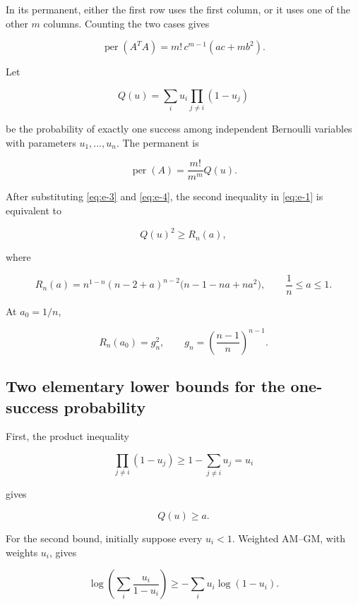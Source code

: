\documentclass[11pt,a4paper]{article}
\theoremstyle{definition}
\theoremstyle{remark}
\begin{document}
In its permanent, either the first row uses the first column, or it uses
one of the other \(m\) columns. Counting the two cases gives

\begin{equation}\label{eq:e-3}
\operatorname{per}(A^TA)
=m!\,c^{m-1}(ac+mb^2).
\end{equation}

Let

\[
Q(u)=\sum_i u_i\prod_{j\ne i}(1-u_j)
\]

be the probability of exactly one success among independent Bernoulli
variables with parameters \(u_1,\ldots,u_n\). The permanent is

\begin{equation}\label{eq:e-4}
\operatorname{per}(A)=\frac{m!}{m^m}Q(u).
\end{equation}

After substituting \eqref{eq:e-3} and \eqref{eq:e-4}, the second inequality in \eqref{eq:e-1} is
equivalent to

\begin{equation}\label{eq:e-5}
Q(u)^2\ge R_n(a),
\end{equation}

where

\begin{equation}\label{eq:e-6}
R_n(a)=
n^{1-n}(n-2+a)^{n-2}\bigl(n-1-na+na^2\bigr),
\qquad \frac1n\le a\le1.
\end{equation}

At \(a_0=1/n\),

\[
R_n(a_0)=g_n^2,\qquad
g_n=\left(\frac{n-1}{n}\right)^{n-1}.
\]

\subsection{Two elementary lower bounds for the one-success
probability}\label{special-two-elementary-lower-bounds-for-the-one-success-probability}

First, the product inequality

\[
\prod_{j\ne i}(1-u_j)\ge1-\sum_{j\ne i}u_j=u_i
\]

gives

\begin{equation}\label{eq:e-7}
\boxed{Q(u)\ge a.}
\end{equation}

For the second bound, initially suppose every \(u_i<1\). Weighted
AM--GM, with weights \(u_i\), gives

\[
\log\left(\sum_i\frac{u_i}{1-u_i}\right)
\ge-\sum_i u_i\log(1-u_i).
\]
\end{document}
